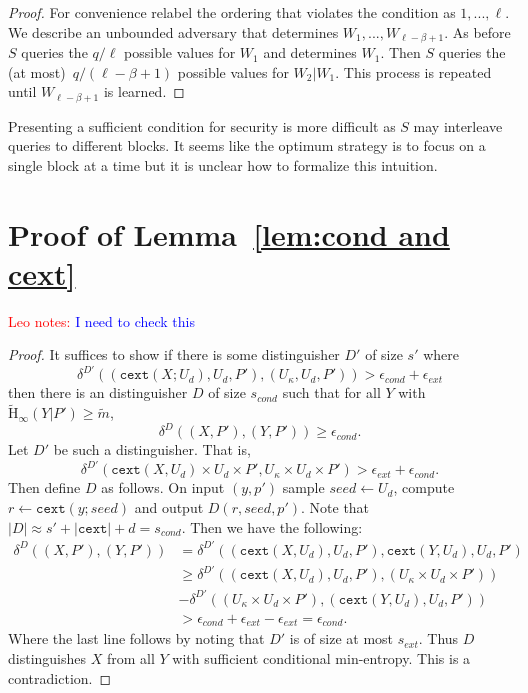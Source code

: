 \documentclass[11pt]{article}
\newcommand{\lemref}[1]{\mbox{Lemma~\ref{#1}}}
\newcommand{\Hav}{\tilde{\mathrm{H}}_\infty}
\newcommand{\cext}{\ensuremath{\mathtt{cext}}}
\newcommand{\authnote}[2]{{\textcolor{red}{\textsf{#1 notes: }\textcolor{blue}{ #2}}\marginpar{\textcolor{red}{\textbf{!!!!!}}}}}
\newcommand{\authnote}[2]{}
\newcommand{\lnote}[1]{{\authnote{Leo}{#1}}}
\begin{document}
\begin{proof}
For convenience relabel the ordering that violates the condition as $1,..., \ell$.  We describe an unbounded adversary that determines $W_1,..., W_{\ell-\beta+1}$.  As before $S$ queries the $q /\ell$ possible values for $W_1$ and determines $W_1$.  Then $S$ queries the (at most)~$q/(\ell-\beta+1)$ possible values for $W_2 | W_1$.  This process is repeated until $W_{\ell-\beta+1}$ is learned.  
\end{proof}

Presenting a sufficient condition for security is more difficult as $S$ may interleave queries to different blocks.  It seems like the optimum strategy is to focus on a single block at a time but it is unclear how to formalize this intuition.

 
\section{Proof of \lemref{lem:cond and cext}}
\label{sec:cond and cext}
\lnote{I need to check this}
\begin{proof}
It suffices to show if there is some distinguisher $D'$ of size $s'$ where
\[\delta^{D'}((\cext(X; U_d), U_d, P'), (U_\kappa, U_d, P'))>\epsilon_{cond}+ \epsilon_{ext}\]
 then there is an distinguisher $D$ of size $s_{cond}$ such that for all $Y$ with $\Hav(Y|P') \geq \tilde{m}$,
 \[
 \delta^{D}((X,P'), (Y, P'))\geq \epsilon_{cond}.
 \]
Let $D'$ be such a distinguisher.  That is,
\[
\delta^{D'}(\cext(X, U_d)\times U_d \times P', U_\kappa\times U_d\times P')> \epsilon_{ext}+\epsilon_{cond}.
\]
Then define $D$ as follows.  On input $(y, p')$ sample $seed\leftarrow U_d$, compute $r\leftarrow \cext(y; seed)$ and output $D(r, seed, p')$.  Note that $|D| \approx s' + |\cext| +d= s_{cond}$.  Then we have the following:
\begin{align*}
\delta^{D}((X, P'), (Y, P'))&= \delta^{D'}((\cext(X, U_d), U_d, P'), \cext(Y, U_d), U_d, P')\\
&\geq \delta^{D'}((\cext(X, U_d), U_d, P'), (U_\kappa\times U_d \times P')) \\
&- \delta^{D'}((U_\kappa\times U_d \times P'), (\cext(Y, U_d), U_d, P'))\\
&>\epsilon_{cond}+\epsilon_{ext}- \epsilon_{ext} = \epsilon_{cond}.
\end{align*}
Where the last line follows by noting that $D'$ is of size at most $s_{ext}$.  Thus $D$ distinguishes $X$ from all $Y$ with sufficient conditional min-entropy.  This is a contradiction.
\end{proof}
\end{document}
